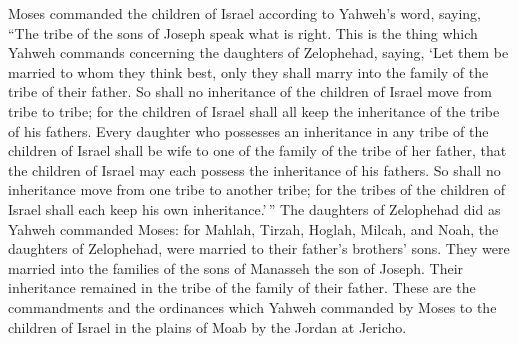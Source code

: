  Moses commanded the children of Israel according to
Yahweh's word, saying, ``The tribe of the sons of Joseph speak what is
right.  This is the thing which Yahweh commands concerning
the daughters of Zelophehad, saying, `Let them be married to whom they
think best, only they shall marry into the family of the tribe of their
father.  So shall no inheritance of the children of Israel
move from tribe to tribe; for the children of Israel shall all keep the
inheritance of the tribe of his fathers.  Every daughter
who possesses an inheritance in any tribe of the children of Israel
shall be wife to one of the family of the tribe of her father, that the
children of Israel may each possess the inheritance of his fathers.
 So shall no inheritance move from one tribe to another
tribe; for the tribes of the children of Israel shall each keep his own
inheritance.'\,''  The daughters of Zelophehad did as
Yahweh commanded Moses:  for Mahlah, Tirzah, Hoglah,
Milcah, and Noah, the daughters of Zelophehad, were married to their
father's brothers' sons.  They were married into the
families of the sons of Manasseh the son of Joseph. Their inheritance
remained in the tribe of the family of their father. 
These are the commandments and the ordinances which Yahweh commanded by
Moses to the children of Israel in the plains of Moab by the Jordan at
Jericho.
